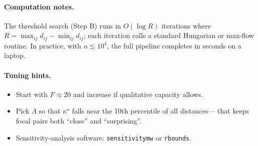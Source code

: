 \documentclass[12pt,letterpaper]{article}  %
\begin{document}
\paragraph{Computation notes.}
The threshold search (Step B) runs in $O(\log R)$ iterations where
$R=\max_{ij}d_{ij}-\min_{ij}d_{ij}$; each iteration calls a standard Hungarian
or max-flow routine.  In practice, with $n\lesssim10^4$, the full pipeline
completes in seconds on a laptop.

\paragraph{Tuning hints.}
\begin{itemize}[leftmargin=1.3em]
    \item Start with \(F\approx20\) and increase if qualitative capacity allows.
    \item Pick $\Lambda$ so that $\kappa^\star$ falls near the 10th percentile of all distances—
          that keeps focal pairs both “close” and “surprising”.
    \item Sensitivity‐analysis software: \texttt{sensitivitymw} or \texttt{rbounds}.
\end{itemize}
\end{document}
